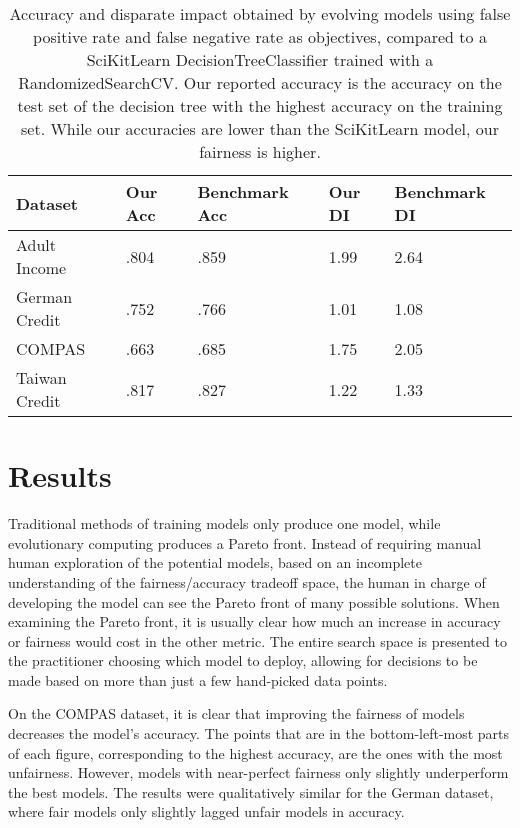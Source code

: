 \documentclass{elsarticle}
\begin{document}
\renewcommand{\arraystretch}{1.5}
\begin{table}
	\begin{center}
	\begin{tabular}{| l | l | l | l | l |}
	\hline Dataset & Our Acc & Benchmark Acc & Our DI & Benchmark DI
	\\ \hline Adult Income  & .804 & .859 & 1.99 & 2.64
	\\ \hline German Credit & .752 & .766 & 1.01 & 1.08
	\\ \hline COMPAS        & .663 & .685 & 1.75 & 2.05
	\\ \hline Taiwan Credit & .817 & .827 & 1.22 & 1.33
	\\ \hline
	\end{tabular}
	\end{center}
	\caption{Accuracy and disparate impact obtained by evolving models using false positive rate and false negative rate as objectives, compared to a SciKitLearn DecisionTreeClassifier trained with a RandomizedSearchCV. Our reported accuracy is the accuracy on the test set of the decision tree with the highest accuracy on the training set. While our accuracies are lower than the SciKitLearn model, our fairness is higher.}
\end{table}

\section{Results}	
Traditional methods of training models only produce one model, while evolutionary computing produces a Pareto front.  Instead of requiring manual human exploration of the potential models, based on an incomplete understanding of the fairness/accuracy tradeoff space, the human in charge of developing the model can see the Pareto front of many possible solutions. When examining the Pareto front, it is usually clear how much an increase in accuracy or fairness would cost in the other metric. The entire search space is presented to the practitioner choosing which model to deploy, allowing for decisions to be made based on more than just a few hand-picked data points.

On the COMPAS dataset, it is clear that improving the fairness of models decreases the model’s accuracy. The points that are in the bottom-left-most parts of each figure, corresponding to the highest accuracy, are the ones with the most unfairness. However, models with near-perfect fairness only slightly underperform the best models. The results were qualitatively similar for the German dataset, where fair models only slightly lagged unfair models in accuracy. 
\end{document}
